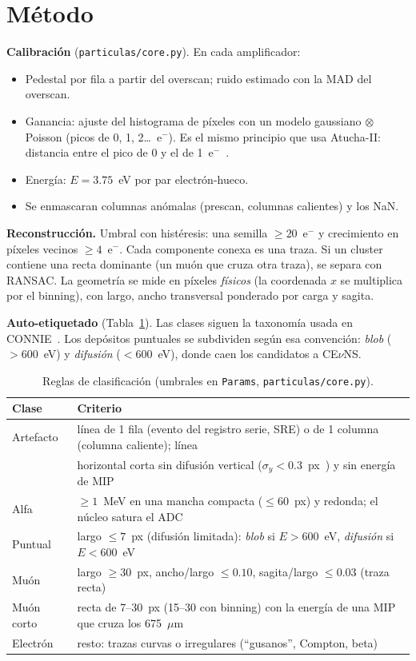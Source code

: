 \documentclass[10pt,a4paper]{article}
\newcommand{\eminus}{e$^-$}
\begin{document}
\section{Método}
\textbf{Calibración} (\texttt{particulas/core.py}). En cada amplificador:
\begin{itemize}
\item Pedestal por fila a partir del overscan; ruido estimado con la MAD del overscan.
\item Ganancia: ajuste del histograma de píxeles con un modelo gaussiano $\otimes$ Poisson (picos de 0, 1,
  2\ldots\ \eminus). Es el mismo principio que usa Atucha-II: distancia entre el pico de 0 y el de 1~\eminus~\cite{depaoli2024}.
\item Energía: $E = 3.75$~eV por par electrón-hueco.
\item Se enmascaran columnas anómalas (prescan, columnas calientes) y los NaN.
\end{itemize}

\textbf{Reconstrucción.} Umbral con histéresis: una semilla $\geq 20$~\eminus{} y crecimiento en píxeles
vecinos $\geq 4$~\eminus. Cada componente conexa es una traza. Si un cluster contiene una recta dominante
(un muón que cruza otra traza), se separa con RANSAC. La geometría se mide en píxeles \emph{físicos}
(la coordenada $x$ se multiplica por el binning), con largo, ancho transversal ponderado por carga y sagita.

\textbf{Auto-etiquetado} (Tabla~\ref{tab:reglas}). Las clases siguen la taxonomía usada en CONNIE~\cite{mirthis2025,mirthis2026}.
Los depósitos puntuales se subdividen según esa convención: \emph{blob} ($>600$~eV) y \emph{difusión}
($<600$~eV), donde caen los candidatos a CE$\nu$NS.

\begin{table}[h]
\centering\small
\caption{Reglas de clasificación (umbrales en \texttt{Params}, \texttt{particulas/core.py}).}
\label{tab:reglas}
\begin{tabular}{@{}ll@{}}
\toprule
Clase & Criterio \\
\midrule
Artefacto & línea de 1 fila (evento del registro serie, SRE) o de 1 columna (columna caliente); línea \\
 & \quad horizontal corta sin difusión vertical ($\sigma_y<0.3$~px~\cite{depaoli2024}) y sin energía de MIP \\
Alfa & $\geq 1$~MeV en una mancha compacta ($\leq 60$~px) y redonda; el núcleo satura el ADC \\
Puntual & largo $\leq 7$~px (difusión limitada): \emph{blob} si $E>600$~eV, \emph{difusión} si $E<600$~eV \\
Muón & largo $\geq 30$~px, ancho/largo $\leq 0.10$, sagita/largo $\leq 0.03$ (traza recta) \\
Muón corto & recta de 7--30~px (15--30 con binning) con la energía de una MIP que cruza los 675~$\mu$m \\
Electrón & resto: trazas curvas o irregulares (``gusanos'', Compton, beta) \\
\bottomrule
\end{tabular}
\end{table}
\end{document}
